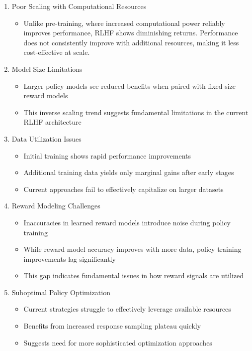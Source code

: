 \begin{enumerate}
\item Poor Scaling with Computational Resources
\begin{itemize}
\item Unlike pre-training, where increased computational power reliably improves performance, RLHF shows diminishing returns. Performance does not consistently improve with additional resources, making it less cost-effective at scale.
\end{itemize}

\item Model Size Limitations
\begin{itemize}
\item Larger policy models see reduced benefits when paired with fixed-size reward models
\item This inverse scaling trend suggests fundamental limitations in the current RLHF architecture
\end{itemize}

\item Data Utilization Issues
\begin{itemize}
\item Initial training shows rapid performance improvements
\item Additional training data yields only marginal gains after early stages
\item Current approaches fail to effectively capitalize on larger datasets
\end{itemize}

\item Reward Modeling Challenges
\begin{itemize}
\item Inaccuracies in learned reward models introduce noise during policy training
\item While reward model accuracy improves with more data, policy training improvements lag significantly
\item This gap indicates fundamental issues in how reward signals are utilized
\end{itemize}

\item Suboptimal Policy Optimization
\begin{itemize}
\item Current strategies struggle to effectively leverage available resources
\item Benefits from increased response sampling plateau quickly
\item Suggests need for more sophisticated optimization approaches
\end{itemize}
\end{enumerate}

